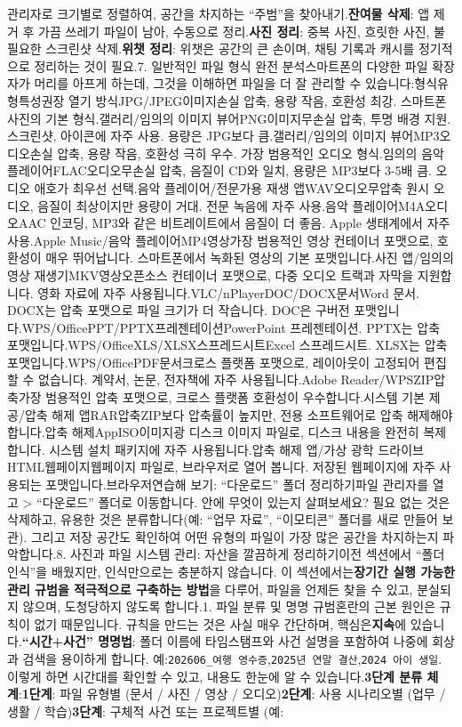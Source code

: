 관리자로 크기별로 정렬하여, 공간을 차지하는 “주범”을 찾아내기.\textbf{잔여물 삭제}: 앱 제거 후 가끔 쓰레기 파일이 남아, 수동으로 정리.\textbf{사진 정리}: 중복 사진, 흐릿한 사진, 불필요한 스크린샷 삭제.\textbf{위챗 정리}: 위챗은 공간의 큰 손이며, 채팅 기록과 캐시를 정기적으로 정리하는 것이 필요.7. 일반적인 파일 형식 완전 분석스마트폰의 다양한 파일 확장자가 머리를 아프게 하는데, 그것을 이해하면 파일을 더 잘 관리할 수 있습니다:형식유형특성권장 열기 방식JPG/JPEG이미지손실 압축, 용량 작음, 호환성 최강. 스마트폰 사진의 기본 형식.갤러리/임의의 이미지 뷰어PNG이미지무손실 압축, 투명 배경 지원. 스크린샷, 아이콘에 자주 사용. 용량은 JPG보다 큼.갤러리/임의의 이미지 뷰어MP3오디오손실 압축, 용량 작음, 호환성 극히 우수. 가장 범용적인 오디오 형식.임의의 음악 플레이어FLAC오디오무손실 압축, 음질이 CD와 일치, 용량은 MP3보다 3-5배 큼. 오디오 애호가 최우선 선택.음악 플레이어/전문가용 재생 앱WAV오디오무압축 원시 오디오, 음질이 최상이지만 용량이 거대. 전문 녹음에 자주 사용.음악 플레이어M4A오디오AAC 인코딩, MP3와 같은 비트레이트에서 음질이 더 좋음. Apple 생태계에서 자주 사용.Apple Music/음악 플레이어MP4영상가장 범용적인 영상 컨테이너 포맷으로, 호환성이 매우 뛰어납니다. 스마트폰에서 녹화된 영상의 기본 포맷입니다.사진 앱/임의의 영상 재생기MKV영상오픈소스 컨테이너 포맷으로, 다중 오디오 트랙과 자막을 지원합니다. 영화 자료에 자주 사용됩니다.VLC/nPlayerDOC/DOCX문서Word 문서. DOCX는 압축 포맷으로 파일 크기가 더 작습니다. DOC은 구버전 포맷입니다.WPS/OfficePPT/PPTX프레젠테이션PowerPoint 프레젠테이션. PPTX는 압축 포맷입니다.WPS/OfficeXLS/XLSX스프레드시트Excel 스프레드시트. XLSX는 압축 포맷입니다.WPS/OfficePDF문서크로스 플랫폼 포맷으로, 레이아웃이 고정되어 편집할 수 없습니다. 계약서, 논문, 전자책에 자주 사용됩니다.Adobe Reader/WPSZIP압축가장 범용적인 압축 포맷으로, 크로스 플랫폼 호환성이 우수합니다.시스템 기본 제공/압축 해제 앱RAR압축ZIP보다 압축률이 높지만, 전용 소프트웨어로 압축 해제해야 합니다.압축 해제AppISO이미지광 디스크 이미지 파일로, 디스크 내용을 완전히 복제합니다. 시스템 설치 패키지에 자주 사용됩니다.압축 해제 앱/가상 광학 드라이브HTML웹페이지웹페이지 파일로, 브라우저로 열어 봅니다. 저장된 웹페이지에 자주 사용되는 포맷입니다.브라우저연습해 보기: “다운로드” 폴더 정리하기파일 관리자를 열고 > “다운로드” 폴더로 이동합니다. 안에 무엇이 있는지 살펴보세요? 필요 없는 것은 삭제하고, 유용한 것은 분류합니다(예: “업무 자료”, “이모티콘” 폴더를 새로 만들어 보관). 그리고 저장 공간도 확인하여 어떤 유형의 파일이 가장 많은 공간을 차지하는지 파악합니다.8. 사진과 파일 시스템 관리: 자산을 깔끔하게 정리하기이전 섹션에서 “폴더 인식”을 배웠지만, 인식만으로는 충분하지 않습니다. 이 섹션에서는\textbf{장기간 실행 가능한 관리 규범을 적극적으로 구축하는 방법}을 다루어, 파일을 언제든 찾을 수 있고, 분실되지 않으며, 도청당하지 않도록 합니다.1. 파일 분류 및 명명 규범혼란의 근본 원인은 규칙이 없기 때문입니다. 규칙을 만드는 것은 사실 매우 간단하며, 핵심은\textbf{지속}에 있습니다.\textbf{“시간+사건” 명명법}: 폴더 이름에 타임스탬프와 사건 설명을 포함하여 나중에 회상과 검색을 용이하게 합니다. 예:\texttt{202606\_여행 영수증},\texttt{2025년 연말 결산},\texttt{2024 아이 생일}. 이렇게 하면 시간대를 확인할 수 있고, 내용도 한눈에 알 수 있습니다.\textbf{3단계 분류 체계}:\textbf{1단계}: 파일 유형별 (문서 / 사진 / 영상 / 오디오)\textbf{2단계}: 사용 시나리오별 (업무 / 생활 / 학습)\textbf{3단계}: 구체적 사건 또는 프로젝트별 (예: 